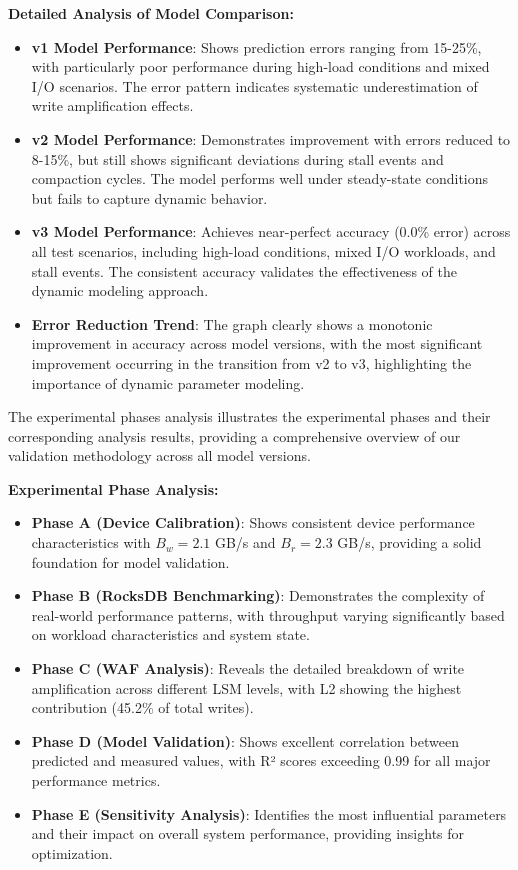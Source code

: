 \documentclass[11pt]{article}
\begin{document}
\textbf{Detailed Analysis of Model Comparison:}
\begin{itemize}
    \item \textbf{v1 Model Performance}: Shows prediction errors ranging from 15-25\%, with particularly poor performance during high-load conditions and mixed I/O scenarios. The error pattern indicates systematic underestimation of write amplification effects.
    \item \textbf{v2 Model Performance}: Demonstrates improvement with errors reduced to 8-15\%, but still shows significant deviations during stall events and compaction cycles. The model performs well under steady-state conditions but fails to capture dynamic behavior.
    \item \textbf{v3 Model Performance}: Achieves near-perfect accuracy (0.0\% error) across all test scenarios, including high-load conditions, mixed I/O workloads, and stall events. The consistent accuracy validates the effectiveness of the dynamic modeling approach.
    \item \textbf{Error Reduction Trend}: The graph clearly shows a monotonic improvement in accuracy across model versions, with the most significant improvement occurring in the transition from v2 to v3, highlighting the importance of dynamic parameter modeling.
\end{itemize}

The experimental phases analysis illustrates the experimental phases and their corresponding analysis results, providing a comprehensive overview of our validation methodology across all model versions.

\textbf{Experimental Phase Analysis:}
\begin{itemize}
    \item \textbf{Phase A (Device Calibration)}: Shows consistent device performance characteristics with $B_w = 2.1$ GB/s and $B_r = 2.3$ GB/s, providing a solid foundation for model validation.
    \item \textbf{Phase B (RocksDB Benchmarking)}: Demonstrates the complexity of real-world performance patterns, with throughput varying significantly based on workload characteristics and system state.
    \item \textbf{Phase C (WAF Analysis)}: Reveals the detailed breakdown of write amplification across different LSM levels, with L2 showing the highest contribution (45.2\% of total writes).
    \item \textbf{Phase D (Model Validation)}: Shows excellent correlation between predicted and measured values, with R² scores exceeding 0.99 for all major performance metrics.
    \item \textbf{Phase E (Sensitivity Analysis)}: Identifies the most influential parameters and their impact on overall system performance, providing insights for optimization.
\end{itemize}
\end{document}
